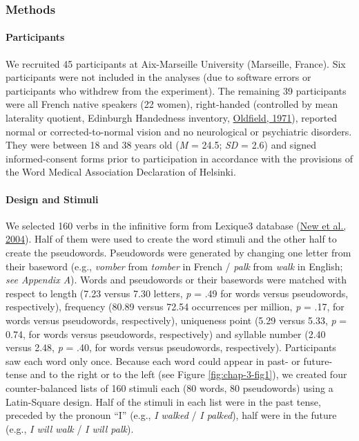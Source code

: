 \documentclass[
  a4paper,12pt,twoside,onecolumn,openright,final,oldfontcommands]{memoir}
\begin{document}
\hypertarget{methods}{%
\subsubsection{Methods}\label{methods}}

\hypertarget{participants}{%
\paragraph{Participants}\label{participants}}

We recruited 45 participants at Aix-Marseille University (Marseille, France). Six participants were not included in the analyses (due to software errors or participants who withdrew from the experiment). The remaining 39 participants were all French native speakers (22 women), right-handed (controlled by mean laterality quotient, Edinburgh Handedness inventory, \protect\hyperlink{ref-oldfield_assessment_1971}{Oldfield, 1971}), reported normal or corrected-to-normal vision and no neurological or psychiatric disorders. They were between 18 and 38 years old (\emph{M} = 24.5; \emph{SD} = 2.6) and signed informed-consent forms prior to participation in accordance with the provisions of the Word Medical Association Declaration of Helsinki.

\hypertarget{design-and-stimuli}{%
\paragraph{Design and Stimuli}\label{design-and-stimuli}}

We selected 160 verbs in the infinitive form from Lexique3 database (\protect\hyperlink{ref-new_lexique_2004}{New et al., 2004}). Half of them were used to create the word stimuli and the other half to create the pseudowords. Pseudowords were generated by changing one letter from their baseword (e.g., \emph{vomber} from \emph{tomber} in French / \emph{palk} from \emph{walk} in English; \emph{see Appendix A}). Words and pseudowords or their basewords were matched with respect to length (7.23 versus 7.30 letters, \emph{p} = .49 for words versus pseudowords, respectively), frequency (80.89 versus 72.54 occurrences per million, \emph{p} = .17, for words versus pseudowords, respectively), uniqueness point (5.29 versus 5.33, \emph{p} = 0.74, for words versus pseudowords, respectively) and syllable number (2.40 versus 2.48, \emph{p} = .40, for words versus pseudowords, respectively). Participants saw each word only once. Because each word could appear in past- or future-tense and to the right or to the left (see Figure \ref{fig:chap-3-fig1}), we created four counter-balanced lists of 160 stimuli each (80 words, 80 pseudowords) using a Latin-Square design. Half of the stimuli in each list were in the past tense, preceded by the pronoun ``I'' (e.g., \emph{I walked} / \emph{I palked}), half were in the future (e.g., \emph{I will walk} / \emph{I will palk}).
\end{document}
